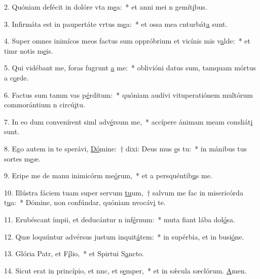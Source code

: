 2. Quóniam defécit in dolóre vta m\uline{e}a:~* et anni mei n gemít\uline{i}bus.\par 
3. Infirmáta est in paupertáte vrtus m\uline{e}a:~* et ossa mea cnturbát\uline{a} sunt.\par 
4. Super omnes inimícos meos factus sum oppróbrium et vicínis mis v\uline{a}lde:~* et timr notis m\uline{e}is.\par 
5. Qui vidébant me, foras fugrunt \uline{a} me:~* oblivióni datus sum, tamquam mórtus a c\uline{o}rde.\par 
6. Factus sum tamm vas p\uline{é}rditum:~* quóniam audívi vituperatiónem multórum commorántium n circú\uline{i}tu.\par 
7. In eo dum convenírent siml adv\uline{é}rsum me,~* accípere ánimam meam consliát\uline{i} sunt.\par 
8. Ego autem in te sperávi, \uline{Dó}mine:~† dixi: Deus mus \uline{e}s tu:~* in mánibus tus sortes m\uline{e}æ.\par 
9. Eripe me de manu inimicórm me\uline{ó}rum,~* et a persquéntib\uline{u}s me.\par 
10. Illústra fáciem tuam super servum \uline{tu}um,~† salvum me fac in misericórda t\uline{u}a:~* Dómine, non confúndar, quóniam nvocáv\uline{i} te.\par 
11. Erubéscant ímpii, et deducántur n inf\uline{é}rnum:~* muta fiant lába dol\uline{ó}sa.\par 
12. Quæ loquúntur advérsus justum inquit\uline{á}tem:~* in supérbia, et in busi\uline{ó}ne.\par 
13. Glória Patr, et F\uline{í}lio,~* et Spirtui S\uline{a}ncto.\par 
14. Sicut erat in princípio, et nnc, et s\uline{e}mper,~* et in sǽcula sæclórum. \uline{A}men.\par 

